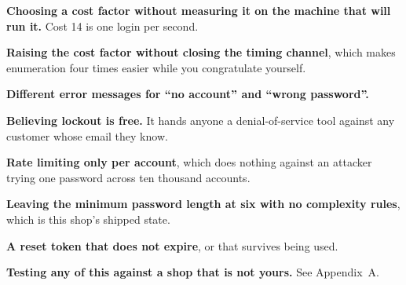 \begin{pitfall}
\begin{tight}
  \item \textbf{Choosing a cost factor without measuring it on the machine that
        will run it.} Cost 14 is one login per second.
  \item \textbf{Raising the cost factor without closing the timing channel},
        which makes enumeration four times easier while you congratulate
        yourself.
  \item \textbf{Different error messages for ``no account'' and ``wrong
        password''.}
  \item \textbf{Believing lockout is free.} It hands anyone a denial-of-service
        tool against any customer whose email they know.
  \item \textbf{Rate limiting only per account}, which does nothing against an
        attacker trying one password across ten thousand accounts.
  \item \textbf{Leaving the minimum password length at six with no complexity
        rules}, which is this shop's shipped state.
  \item \textbf{A reset token that does not expire}, or that survives being
        used.
  \item \textbf{Testing any of this against a shop that is not yours.} See
        Appendix~A.
\end{tight}
\end{pitfall}


